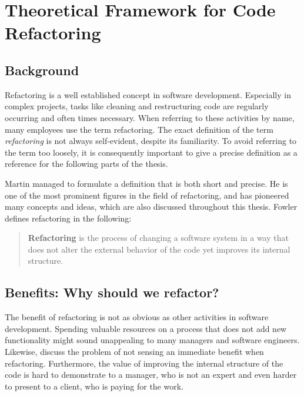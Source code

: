 \chapter{Theoretical Framework for Code Refactoring}

\section{Background}
\label{sec:background}


Refactoring is a well established concept in software development.
Especially in complex projects, 
	tasks like cleaning and restructuring code are regularly occurring and often times necessary. 
When referring to these activities by name, many employees use the term refactoring. 
The exact definition of the term \emph{refactoring} is not always self-evident,
	despite its familiarity.
To avoid referring to the term too loosely, 
	it is consequently important to give a precise definition as a reference for the following parts of the  thesis. 

Martin \textcite{fowler2018} managed to formulate a definition that is both short and precise. 
He is one of the most prominent figures in the field of refactoring, 
	and has pioneered many concepts and ideas, which are also discussed throughout this thesis.
Fowler defines refactoring in the following:
\begin{quote}
\textbf{Refactoring} is the process of changing a software system in a way 
	that does not alter the external behavior of the code yet improves its internal structure.
\end{quote}



\clearpage
\section{Benefits: Why should we refactor?}
\label{sec:benefits}

The benefit of refactoring is not as obvious as other activities in software development. 
Spending valuable resources on a process that does not add new functionality 
	might sound unappealing to many managers and software engineers.
Likewise, \textcite{kim2012} discuss the problem of not sensing an immediate benefit when refactoring.
Furthermore, the value of improving the internal structure of the code is hard to demonstrate to a manager, 
	who is not an expert and even harder to present to a client, who is paying for the work.


